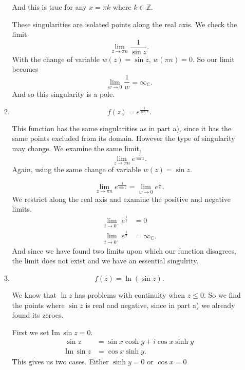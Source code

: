 \documentclass{article}
\begin{document}
\begin{enumerate}
\begin{enumerate}[label= (\alph*)]
            And this is true for any $x=\pi k$ where $k\in \mathbb{Z}$.

            These singularities are isolated points along the real axis. We check the limit
            \[
            \lim_{z \to \pi n} \frac{1}{\sin z}
            .\] 
            With the change of variable $w(z)=\sin z$, $w(\pi n)=0$. So our limit becomes
            \[
            \lim_{w \to 0} \frac{1}{w}=\infty_{\mathbb{C}}
            .\] 
            And so this singularity is a pole.

        \item \[ f(z)=e^{\frac{1}{\sin z}} .\] 

            This function has the same singularities as in part a), since it has the same points 
            excluded from its domain. However the type of singularity may change. We examine the same
            limit,
            \[
            \lim_{z \to \pi n} e^{\frac{1}{\sin z}}
            .\] 
            Again, using the same change of variable $w(z)=\sin z$.

            \[
                \lim_{z \to \pi n} e^{\frac{1}{\sin z}}=\lim_{w \to 0} e^{\frac{1}{w}}
            .\] 
            We restrict along the real axis and examine the positive and negative limits. 
            \begin{align*}
                \lim_{t \to 0^{-}} e^{\frac{1}{t}}&= 0 \\
                \lim_{t \to 0^{+}} e^{\frac{1}{t}}&= \infty_{\mathbb{C}} 
            .\end{align*}
            And since we have found two limits upon which our function disagrees, the limit does
            not exist and we have an essential singulrity.


        \item \[ f(z)=\ln(\sin z) .\] 

            We know that $\ln z$ has problems with continuity when $z\leq 0$. So we find the points 
            where $\sin z$ is real and negative, since in part a) we already found its zeroes.

            First we set $\mathrm{Im}\,\sin z=0$.
            \begin{align*}
                \sin z &= \sin x\cosh y+i\cos x \sinh y\\
                \mathrm{Im}\,\sin z&= \cos x\sinh y 
            .\end{align*}
            This gives us two cases. Either $\sinh y=0$ or $\cos x = 0$


\end{enumerate}
\end{enumerate}
\end{document}
